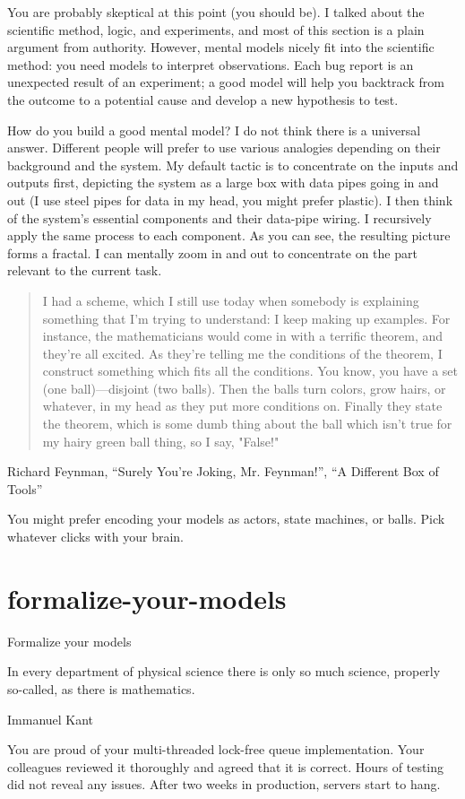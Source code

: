 \documentclass{article}
\begin{document}
You are probably skeptical at this point (you should be).
I talked about the scientific method, logic, and experiments, and most of this section is a plain argument from authority.
However, mental models nicely fit into the scientific method: you need models to interpret observations.
Each bug report is an unexpected result of an experiment; a good model will help you backtrack from the outcome to a potential cause and develop a new hypothesis to test.

How do you build a good mental model?
I do not think there is a universal answer.
Different people will prefer to use various analogies depending on their background and the system.
My default tactic is to concentrate on the inputs and outputs first, depicting the system as a large box with data pipes going in and out (I use steel pipes for data in my head, you might prefer plastic).
I then think of the system's essential components and their data-pipe wiring.
I recursively apply the same process to each component.
As you can see, the resulting picture forms a fractal.
I can mentally zoom in and out to concentrate on the part relevant to the current task.

\blockquote{
  I had a scheme, which I still use today when somebody is explaining something that I'm trying to understand: I keep making up examples.
  For instance, the mathematicians would come in with a terrific theorem, and they're all excited.
  As they're telling me the conditions of the theorem, I construct something which fits all the conditions.
  You know, you have a set (one ball)---disjoint (two balls).
  Then the balls turn colors, grow hairs, or whatever, in my head as they put more conditions on.
  Finally they state the theorem, which is some dumb thing about the ball which isn't true for my hairy green ball thing, so I say, "False!"
}{Richard Feynman, ``Surely You're Joking, Mr. Feynman!'', ``A Different Box of Tools''}

You might prefer encoding your models as actors, state machines, or balls.
Pick whatever clicks with your brain.

\section{formalize-your-models}{Formalize your models}

\epigraph{
  In every department of physical science there is only so much science, properly so-called, as there is mathematics.
}{Immanuel Kant}

You are proud of your multi-threaded lock-free queue implementation.
Your colleagues reviewed it thoroughly and agreed that it is correct.
Hours of testing did not reveal any issues.
After two weeks in production, servers start to hang.
\end{document}
